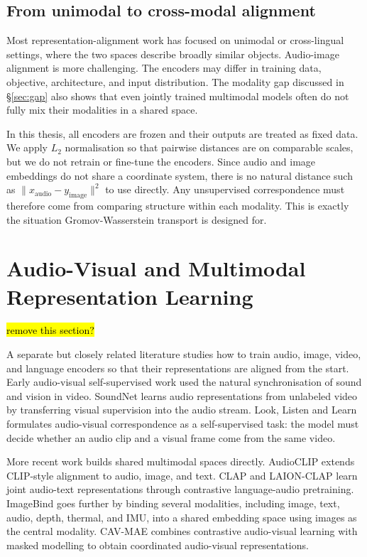 \subsection{From unimodal to cross-modal alignment}

Most representation-alignment work has focused on unimodal or cross-lingual settings, where the two spaces describe broadly similar objects. Audio-image alignment is more challenging. The encoders may differ in training data, objective, architecture, and input distribution. The modality gap discussed in \S\ref{sec:gap} also shows that even jointly trained multimodal models often do not fully mix their modalities in a shared space.

In this thesis, all encoders are frozen and their outputs are treated as fixed data. We apply $L_2$ normalisation so that pairwise distances are on comparable scales, but we do not retrain or fine-tune the encoders. Since audio and image embeddings do not share a coordinate system, there is no natural distance such as $\|x_{\mathrm{audio}} - y_{\mathrm{image}}\|^2$ to use directly. Any unsupervised correspondence must therefore come from comparing structure within each modality. This is exactly the situation Gromov-Wasserstein transport is designed for.

\section{Audio-Visual and Multimodal Representation Learning} \hl{remove this section?}
\label{sec:avmulti}

A separate but closely related literature studies how to train audio, image, video, and language encoders so that their representations are aligned from the start. Early audio-visual self-supervised work used the natural synchronisation of sound and vision in video. SoundNet \cite{aytar2016soundnet} learns audio representations from unlabeled video by transferring visual supervision into the audio stream. Look, Listen and Learn \cite{arandjelovic2017look} formulates audio-visual correspondence as a self-supervised task: the model must decide whether an audio clip and a visual frame come from the same video.

More recent work builds shared multimodal spaces directly. AudioCLIP \cite{guzhov2021audioclip} extends CLIP-style alignment to audio, image, and text. CLAP \cite{elizalde2022clap} and LAION-CLAP \cite{wu2023large} learn joint audio-text representations through contrastive language-audio pretraining. ImageBind \cite{girdhar2023imagebind} goes further by binding several modalities, including image, text, audio, depth, thermal, and IMU, into a shared embedding space using images as the central modality. CAV-MAE \cite{gong2023cavmae} combines contrastive audio-visual learning with masked modelling to obtain coordinated audio-visual representations.

